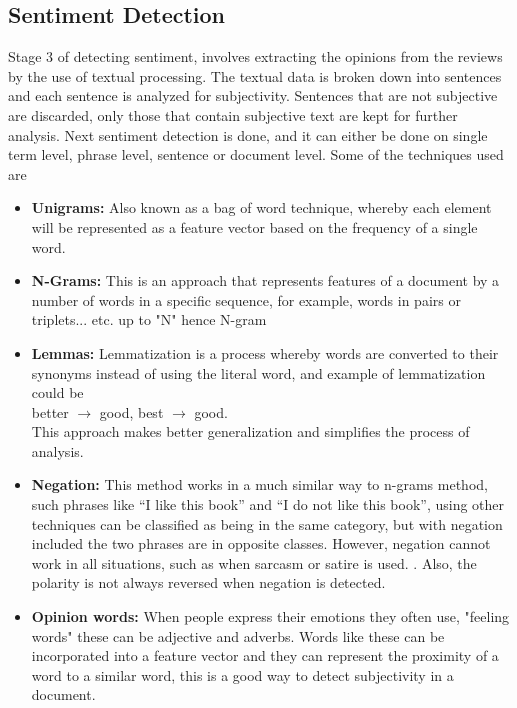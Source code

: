 \subsection{Sentiment Detection}
Stage 3 of detecting sentiment, involves extracting the opinions from the reviews by the use of textual processing. The textual data is broken down into sentences and each sentence is analyzed for subjectivity. Sentences that are not subjective are discarded, only those that contain subjective text are kept for further analysis. Next sentiment detection is done, and it can either be done on single term level, phrase level, sentence or document level. Some of the techniques used are

\begin{itemize}

\item \textbf{Unigrams:} Also known as a bag of word technique, whereby each element will be represented as a feature vector based on the frequency of a single word.

\item \textbf{N-Grams:} This is an approach that represents features of a document by a number of words in a specific sequence, for example, words in pairs or triplets... etc. up to "N" hence N-gram

\item \textbf{Lemmas:} Lemmatization is a process whereby words are converted to their synonyms instead of using the literal word, and example of lemmatization could be\\
better $\xrightarrow{}$ good, best $\xrightarrow{}$ good.\\
This approach makes better generalization and simplifies the process of analysis.

\item \textbf{Negation:} This method works in a much similar way to n-grams method, such phrases like “I like this book” and “I do not like this book”, using other techniques can be classified as being in the same category, but with negation included the two phrases are in opposite classes. However, negation cannot work in all situations, such as when sarcasm or satire is used. \cite{ref19}. Also, the polarity is not always reversed when negation is detected.

\item \textbf{Opinion words:} When people express their emotions they often use, "feeling words" these can be adjective and adverbs. Words like these can be incorporated into a feature vector and they can represent the proximity of a word to a similar word, this is a good way to detect subjectivity in a document.
\end{itemize}

